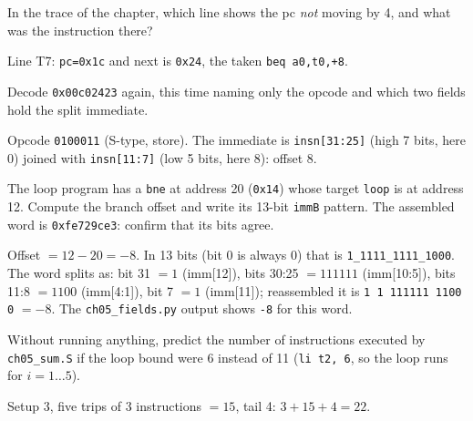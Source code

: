 \begin{exercise}[easy]\label{ex:e05c}
In the trace of the chapter, which line shows the pc \emph{not} moving
by 4, and what was the instruction there?
\end{exercise}
\begin{solution}[hint]
Line T7: \texttt{pc=0x1c} and next is \texttt{0x24}, the taken
\texttt{beq a0,t0,+8}.
\end{solution}

\begin{exercise}[easy]\label{ex:e05d}
Decode \texttt{0x00c02423} again, this time naming only the opcode
and which two fields hold the split immediate.
\end{exercise}
\begin{solution}[hint]
Opcode \texttt{0100011} (S-type, store). The immediate is
\texttt{insn[31:25]} (high 7 bits, here 0) joined with
\texttt{insn[11:7]} (low 5 bits, here 8): offset 8.
\end{solution}

\begin{exercise}[medium]\label{ex:m05f}
The loop program has a \texttt{bne} at address 20 (\texttt{0x14}) whose
target \texttt{loop} is at address 12. Compute the branch offset and
write its 13-bit \texttt{immB} pattern. The assembled word is
\texttt{0xfe729ce3}: confirm that its bits agree.
\end{exercise}
\begin{solution}[hint]
Offset $=12-20=-8$. In 13 bits (bit 0 is always 0) that is
\texttt{1\_1111\_1111\_1000}. The word splits as: bit 31 $=1$ (imm[12]),
bits 30:25 $=111111$ (imm[10:5]), bits 11:8 $=1100$ (imm[4:1]),
bit 7 $=1$ (imm[11]); reassembled it is \texttt{1 1 111111 1100 0}
$=-8$. The \texttt{ch05\_fields.py} output shows \texttt{-8} for this word.
\end{solution}

\begin{exercise}[medium]\label{ex:m05g}
Without running anything, predict the number of instructions executed
by \texttt{ch05\_sum.S} if the loop bound were 6 instead of 11
(\texttt{li t2, 6}, so the loop runs for $i=1\dots5$).
\end{exercise}
\begin{solution}[hint]
Setup 3, five trips of 3 instructions $=15$, tail 4: $3+15+4=22$.
\end{solution}

